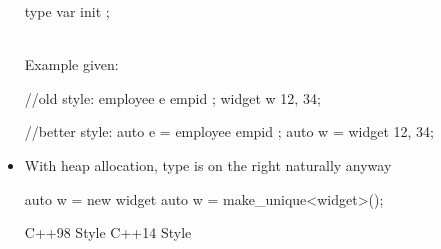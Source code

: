 \begin{itemize}
 \begin{minipage}{\MPWxXXSxLISTING\textwidth} %
{} %
\begin{CPPCode}
        type var{ init };
\end{CPPCode}
    \end{minipage}\\
    Example given:\\
\begin{minipage}{\MPWxXXSxLISTING\textwidth} %
{} %
        \begin{CPPCode}
//old style:
employee e{ empid };
widget w{ 12, 34};
        \end{CPPCode}
    \end{minipage}
    \begin{minipage}{\MPWxXXSxLISTING\textwidth} %
        \begin{CPPCode}
//better style:
auto e = employee{ empid };
auto w = widget{ 12, 34};
        \end{CPPCode}
    \end{minipage}
    
    \item With heap allocation, type is on the right naturally anyway\\
    \begin{minipage}{\MPWxXXSxLISTING\textwidth} %
{} %
        \begin{CPPCode}
auto w = new widget{}           
auto w = make_unique<widget>();
        \end{CPPCode}
    \end{minipage}
    \begin{minipage}{\MPWxXXSxLISTING\textwidth} %
        \begin{CPPCode}
C++98 Style
C++14 Style
        \end{CPPCode}
    \end{minipage}


\end{itemize}
